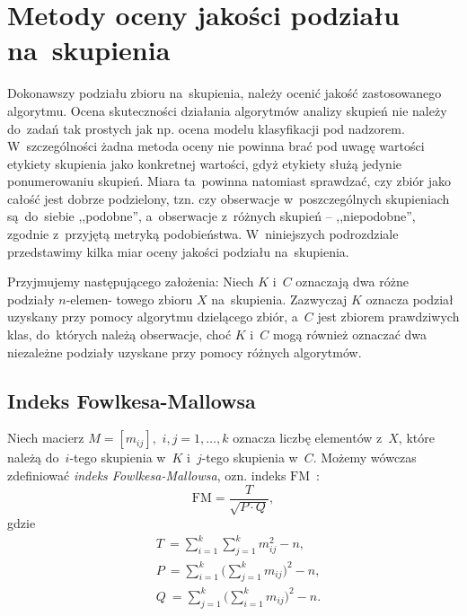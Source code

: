 \documentclass{praca1}
\begin{document}
\section{Metody oceny jakości podziału na~skupienia}	

Dokonawszy podziału zbioru na~skupienia, należy ocenić jakość zastosowanego algorytmu. Ocena skuteczności działania algorytmów analizy skupień nie należy do~zadań tak prostych jak np. ocena modelu klasyfikacji pod nadzorem. W~szczególności żadna metoda oceny nie powinna brać pod uwagę wartości etykiety skupienia jako konkretnej wartości, gdyż etykiety służą jedynie ponumerowaniu skupień. Miara ta~powinna natomiast sprawdzać, czy zbiór jako całość jest dobrze podzielony, tzn. czy obserwacje w~poszczególnych skupieniach są~do~siebie ,,podobne'', a~obserwacje z~różnych skupień -- ,,niepodobne'', zgodnie z~przyjętą metryką podobieństwa. W~niniejszych podrozdziale przedstawimy kilka miar oceny jakości podziału na~skupienia.

Przyjmujemy następującego założenia: Niech $K$ i~$C$ oznaczają dwa różne podziały $n$-elemen- towego zbioru $X$ na~skupienia. Zazwyczaj $K$ oznacza podział uzyskany przy pomocy algorytmu dzielącego zbiór, a~$C$ jest zbiorem prawdziwych klas, do~których należą obserwacje, choć $K$ i~$C$ mogą również oznaczać dwa niezależne podziały uzyskane przy pomocy różnych algorytmów.

\subsection{Indeks Fowlkesa-Mallowsa}

\begin{definition}
Niech macierz $M = [m_{ij}],$ $i,j = 1,\ldots, k$ oznacza liczbę elementów z~$X$, które należą do~$i$-tego skupienia w~$K$ i~$j$-tego skupienia w~$C$. Możemy wówczas zdefiniować \emph{indeks Fowlkesa-Mallowsa}, ozn. indeks $\mathrm{FM}$~\cite{Fowlkes1983:fmindex}:
\begin{equation}
\mathrm{FM} = \frac{T}{\sqrt{P\cdot Q}},
\end{equation}
gdzie 
\begin{align*}
& T~= \sum\limits_{i=1}^{k}\sum\limits_{j=1}^{k} m_{ij}^2 - n,\\
& P~= \sum\limits_{i=1}^{k} \bigg(\sum\limits_{j=1}^{k} m_{ij}\bigg)^2 - n,\\
& Q~= \sum\limits_{j=1}^{k} \bigg(\sum\limits_{i=1}^{k} m_{ij}\bigg)^2 - n.
\end{align*}
\end{definition}
\end{document}
